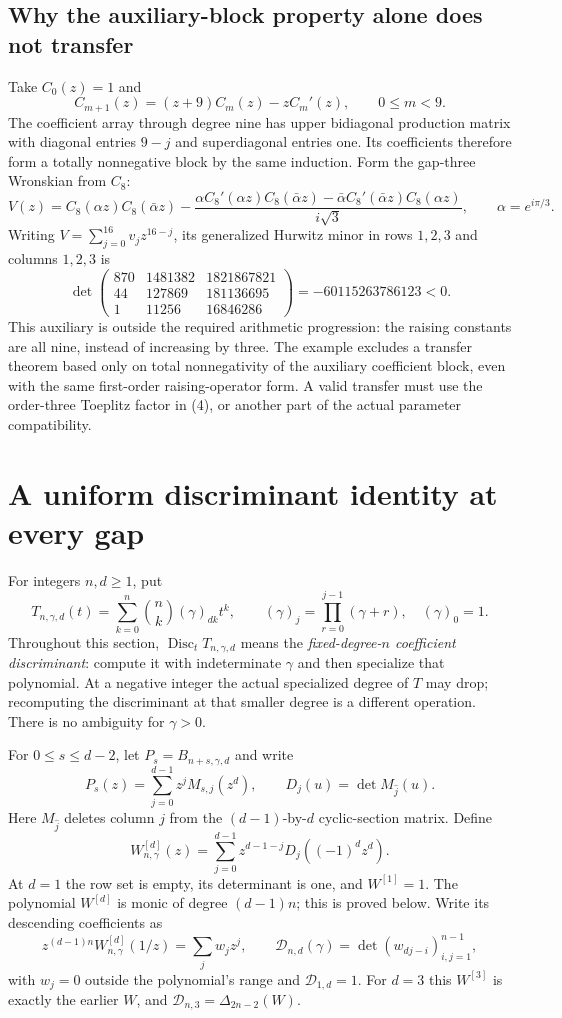 \documentclass[11pt]{article}
\begin{document}
\subsection*{Why the auxiliary-block property alone does not transfer}
Take $C_0(z)=1$ and
\[
 C_{m+1}(z)=(z+9)C_m(z)-zC_m'(z),\qquad 0\le m<9.
\]
The coefficient array through degree nine has upper bidiagonal
production matrix with diagonal entries $9-j$ and superdiagonal
entries one. Its coefficients therefore form a totally nonnegative
block by the same induction. Form the gap-three Wronskian from $C_8$:
\[
 V(z)=C_8(\alpha z)C_8(\bar\alpha z)
 -\frac{\alpha C_8'(\alpha z)C_8(\bar\alpha z)
        -\bar\alpha C_8'(\bar\alpha z)C_8(\alpha z)}{i\sqrt3},
 \qquad \alpha=e^{i\pi/3}.
\]
Writing $V=\sum_{j=0}^{16}v_jz^{16-j}$, its generalized Hurwitz
minor in rows $1,2,3$ and columns $1,2,3$ is
\[
 \det\begin{pmatrix}
 870&1481382&1821867821\\
 44&127869&181136695\\
 1&11256&16846286
 \end{pmatrix}=-60115263786123<0.
\]
This auxiliary is outside the required arithmetic progression:
the raising constants are all nine, instead of increasing by three.
The example excludes a transfer theorem based only on total
nonnegativity of the auxiliary coefficient block, even with the
same first-order raising-operator form. A valid transfer must use
the order-three Toeplitz factor in (4), or another part of the
actual parameter compatibility.

\section{A uniform discriminant identity at every gap}
For integers $n,d\ge1$, put
\[
 T_{n,\gamma,d}(t)=\sum_{k=0}^n\binom nk(\gamma)_{dk}t^k,
 \qquad (\gamma)_j=\prod_{r=0}^{j-1}(\gamma+r),\quad(\gamma)_0=1.
\]
Throughout this section, $\operatorname{Disc}_tT_{n,\gamma,d}$ means the
\emph{fixed-degree-$n$ coefficient discriminant}: compute it with
indeterminate $\gamma$ and then specialize that polynomial.
At a negative integer the actual specialized degree of $T$ may drop;
recomputing the discriminant at that smaller degree is a different
operation. There is no ambiguity for $\gamma>0$.

For $0\le s\le d-2$, let $P_s=B_{n+s,\gamma,d}$ and write
\[
 P_s(z)=\sum_{j=0}^{d-1}z^jM_{s,j}(z^d),\qquad
 D_j(u)=\det M_{\widehat j}(u).
\]
Here $M_{\widehat j}$ deletes column $j$ from the $(d-1)$-by-$d$
cyclic-section matrix. Define
\[
 W^{[d]}_{n,\gamma}(z)=
    \sum_{j=0}^{d-1}z^{d-1-j}D_j((-1)^dz^d).
\]
At $d=1$ the row set is empty, its determinant is one, and $W^{[1]}=1$.
The polynomial $W^{[d]}$ is monic of degree $(d-1)n$; this is proved
below. Write its descending coefficients as
\[
 z^{(d-1)n}W^{[d]}_{n,\gamma}(1/z)=\sum_jw_jz^j,
 \qquad
 \mathcal D_{n,d}(\gamma)=\det(w_{dj-i})_{i,j=1}^{n-1},
\]
with $w_j=0$ outside the polynomial's range and
$\mathcal D_{1,d}=1$.
For $d=3$ this $W^{[3]}$ is exactly the earlier $W$, and
$\mathcal D_{n,3}=\Delta_{2n-2}(W)$.
\end{document}
